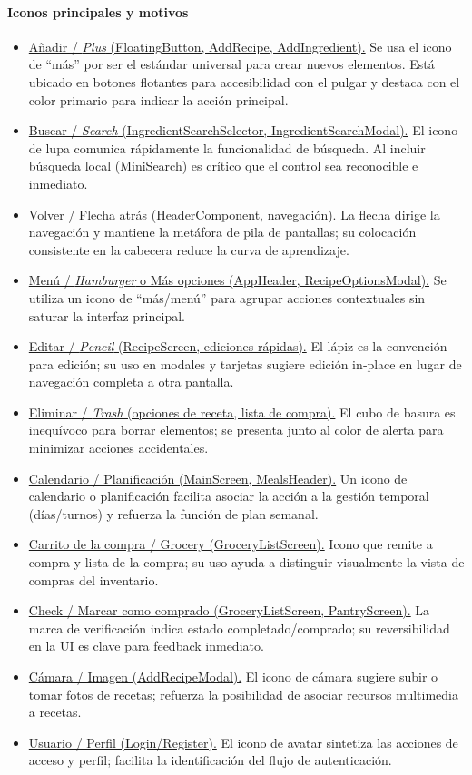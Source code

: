\documentclass[twoside, openright, 11pt]{report}
\begin{document}
				\paragraph{Iconos principales y motivos}
					\begin{itemize}
						\item \underline{Añadir / \textit{Plus} (FloatingButton, AddRecipe, AddIngredient).}  
						Se usa el icono de “más” por ser el estándar universal para crear nuevos elementos. Está ubicado en botones flotantes para accesibilidad con el pulgar y destaca con el color primario para indicar la acción principal.
						\item \underline{Buscar / \textit{Search} (IngredientSearchSelector, IngredientSearchModal).}  
						El icono de lupa comunica rápidamente la funcionalidad de búsqueda. Al incluir búsqueda local (MiniSearch) es crítico que el control sea reconocible e inmediato.
						\item \underline{Volver / Flecha atrás (HeaderComponent, navegación).}  
						La flecha dirige la navegación y mantiene la metáfora de pila de pantallas; su colocación consistente en la cabecera reduce la curva de aprendizaje.
						\item \underline{Menú / \textit{Hamburger} o Más opciones (AppHeader, RecipeOptionsModal).}  
						Se utiliza un icono de “más/menú” para agrupar acciones contextuales sin saturar la interfaz principal.
						\item \underline{Editar / \textit{Pencil} (RecipeScreen, ediciones rápidas).}  
						El lápiz es la convención para edición; su uso en modales y tarjetas sugiere edición in‑place en lugar de navegación completa a otra pantalla.
						\item \underline{Eliminar / \textit{Trash} (opciones de receta, lista de compra).}  
						El cubo de basura es inequívoco para borrar elementos; se presenta junto al color de alerta para minimizar acciones accidentales.
						\item \underline{Calendario / Planificación (MainScreen, MealsHeader).}  
						Un icono de calendario o planificación facilita asociar la acción a la gestión temporal (días/turnos) y refuerza la función de plan semanal.
						\item \underline{Carrito de la compra / Grocery (GroceryListScreen).}  
						Icono que remite a compra y lista de la compra; su uso ayuda a distinguir visualmente la vista de compras del inventario.
						\item \underline{Check / Marcar como comprado (GroceryListScreen, PantryScreen).}  
						La marca de verificación indica estado completado/comprado; su reversibilidad en la UI es clave para feedback inmediato.
						\item \underline{Cámara / Imagen (AddRecipeModal).}  
						El icono de cámara sugiere subir o tomar fotos de recetas; refuerza la posibilidad de asociar recursos multimedia a recetas.
						\item \underline{Usuario / Perfil (Login/Register).}  
						El icono de avatar sintetiza las acciones de acceso y perfil; facilita la identificación del flujo de autenticación.
					\end{itemize}
				
\end{document}
